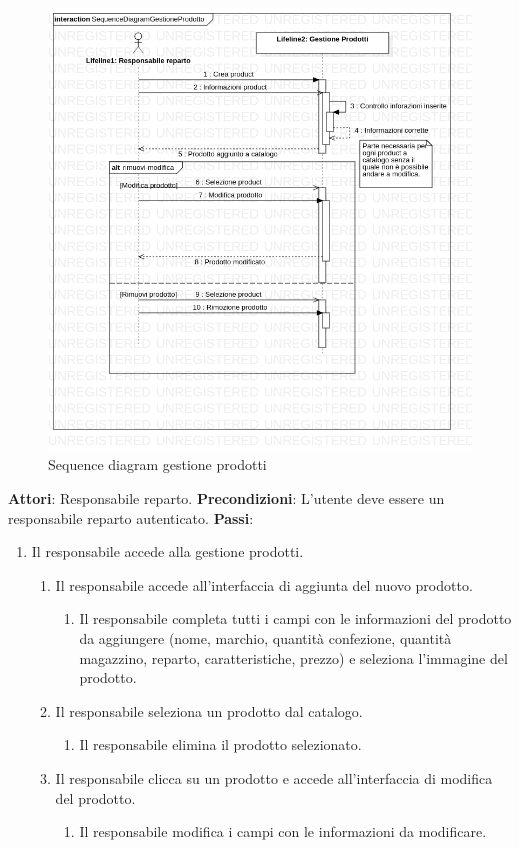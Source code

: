\documentclass[12pt, a4paper]{report}
\begin{document}
\begin{figure}[h]
  \centering
  \includegraphics[width=\textwidth]{Use Case Model!Gestione prodotti!InteractionGestioneProdotti!SequenceDiagramGestioneProdotto_9.png}
  \caption{Sequence diagram gestione prodotti}
\end{figure}
\break
\textbf{Attori}: Responsabile reparto.\newline
\textbf{Precondizioni}: L'utente deve essere un responsabile reparto autenticato. \newline
\textbf{Passi}: 
\begin{enumerate}
\item Il responsabile accede alla gestione prodotti.
\begin{enumerate}
\item Il responsabile accede all'interfaccia di aggiunta del nuovo prodotto. 
\begin{enumerate}
\item Il responsabile completa tutti i campi con le informazioni del prodotto da aggiungere (nome, marchio, quantità confezione, quantità magazzino, reparto, caratteristiche, prezzo) e seleziona l'immagine del prodotto.
\end{enumerate}
\item Il responsabile seleziona un prodotto dal catalogo.
\begin{enumerate}
\item Il responsabile elimina il prodotto selezionato.
\end{enumerate}
\item Il responsabile  clicca su un prodotto e accede all'interfaccia di modifica del prodotto.
\begin{enumerate}
\item Il responsabile modifica i campi con le informazioni da modificare.
\end{enumerate}
\end{enumerate} 

\end{enumerate}
\end{document}
